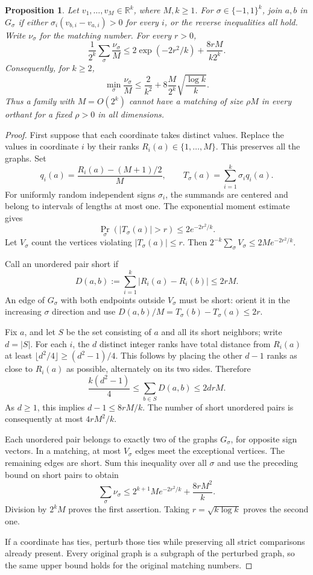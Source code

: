 \documentclass[11pt]{article}
\newtheorem{proposition}{Proposition}
\begin{document}
\begin{proposition}
Let $v_1,\ldots,v_M\in\mathbb R^k$, where $M,k\geq1$.
For $\sigma\in\{-1,1\}^k$, join $a,b$ in $G_\sigma$ if either
$\sigma_i(v_{b,i}-v_{a,i})>0$ for every $i$, or the reverse
inequalities all hold. Write $\nu_\sigma$ for the matching number.
For every $r>0$,
\[
 \frac{1}{2^k}\sum_\sigma\frac{\nu_\sigma}{M}
 \leq 2\exp(-2r^2/k)+\frac{8rM}{k2^k}.
\]
Consequently, for $k\geq2$,
\[
 \min_\sigma\frac{\nu_\sigma}{M}
 \leq\frac{2}{k^2}
       +8\frac{M}{2^k}\sqrt{\frac{\log k}{k}}.
\]
Thus a family with $M=O(2^k)$ cannot have a matching of size
$\rho M$ in every orthant for a fixed $\rho>0$ in all dimensions.
\end{proposition}
\begin{proof}
First suppose that each coordinate takes distinct values. Replace
the values in coordinate $i$ by their ranks $R_i(a)\in\{1,\ldots,M\}$.
This preserves all the graphs. Set
\[
 q_i(a)=\frac{R_i(a)-(M+1)/2}{M},\qquad
 T_\sigma(a)=\sum_{i=1}^k\sigma_iq_i(a).
\]
For uniformly random independent signs $\sigma_i$, the summands
are centered and belong to intervals of lengths at most one.
The exponential moment estimate gives
\[
 \Pr_\sigma(|T_\sigma(a)|>r)\leq2e^{-2r^2/k}.
\]
Let $V_\sigma$ count the vertices violating $|T_\sigma(a)|\leq r$.
Then $2^{-k}\sum_\sigma V_\sigma\leq2Me^{-2r^2/k}$.

Call an unordered pair short if
\[
 D(a,b):=\sum_{i=1}^k|R_i(a)-R_i(b)|\leq2rM.
\]
An edge of $G_\sigma$ with both endpoints outside $V_\sigma$
must be short: orient it in the increasing $\sigma$ direction
and use $D(a,b)/M=T_\sigma(b)-T_\sigma(a)\leq2r$.

Fix $a$, and let $S$ be the set consisting of $a$ and all its
short neighbors; write $d=|S|$. For each $i$, the $d$ distinct
integer ranks have total distance from $R_i(a)$ at least
$\lfloor d^2/4\rfloor\geq(d^2-1)/4$. This follows by placing
the other $d-1$ ranks as close to $R_i(a)$ as possible, alternately
on its two sides. Therefore
\[
 \frac{k(d^2-1)}4
 \leq\sum_{b\in S}D(a,b)\leq2drM.
\]
As $d\geq1$, this implies $d-1\leq8rM/k$. The number of short
unordered pairs is consequently at most $4rM^2/k$.

Each unordered pair belongs to exactly two of the graphs
$G_\sigma$, for opposite sign vectors. In a matching, at most
$V_\sigma$ edges meet the exceptional vertices. The remaining
edges are short. Sum this inequality over all $\sigma$ and use
the preceding bound on short pairs to obtain
\[
 \sum_\sigma\nu_\sigma
 \leq 2^{k+1}Me^{-2r^2/k}+\frac{8rM^2}{k}.
\]
Division by $2^kM$ proves the first assertion. Taking
$r=\sqrt{k\log k}$ proves the second one.

If a coordinate has ties, perturb those ties while preserving
all strict comparisons already present. Every original graph
is a subgraph of the perturbed graph, so the same upper bound
holds for the original matching numbers.
\end{proof}
\end{document}

